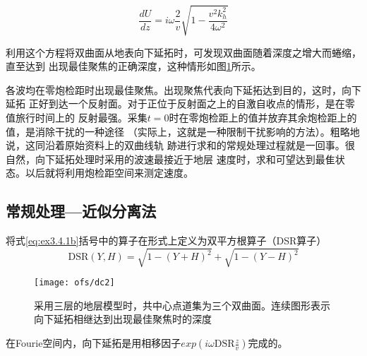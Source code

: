 \begin{equation}
\frac{dU}{dz}=i\omega\frac{2}{v}\sqrt{1-\frac{v^2k_h^2}{4\omega^2}}
\label{eq:ex3.4.3}
\end{equation}

利用这个方程将双曲面从地表向下延拓时，可发现双曲面随着深度之增大而蜷缩，直至达到
出现最佳聚焦的正确深度，这种情形如图\ref{fig:ofs/dc2}所示。

各波均在零炮检距时出现最佳聚焦。出现聚焦代表向下延拓达到目的，这时，向下延拓
正好到达一个反射面。对于正位于反射面之上的自激自收点的情形，是在零值旅行时间上的
反射最强。采集$t=0$时在零炮检距上的值并放弃其余炮检距上的值，是消除干扰的一种途径
（实际上，这就是一种限制干扰影响的方法）。粗略地说，这同沿着原始资料上的双曲线轨
跡进行求和的常规处理过程就是一回事。很自然，向下延拓处理时采用的波速最接近于地层
速度时，求和可望达到最隹状态。以后就将利用炮检距空间来测定速度。


\subsection{常规处理---近似分离法}
\label{sec:3.4.3}

将式\ref{eq:ex3.4.1b}括号中的算子在形式上定义为双平方根算子（DSR算子）
\begin{equation}
\text{DSR}(Y,H)=\sqrt{1-(Y+H)^2}+\sqrt{1-(Y-H)^2}
\label{eq:ex3.4.4}
\end{equation}

\begin{figure}[H]
\centering
\texttt{[image: ofs/dc2]}
\caption[chervon]{采用三层的地层模型时，共中心点道集为三个双曲面。连续图形表示
向下延拓相继达到出现最佳聚焦时的深度}
\label{fig:ofs/dc2}
\end{figure}

在Fourie空间内，向下延拓是用相移因子$exp(i\omega \text{DSR}\frac{z}{v})$完成的。
